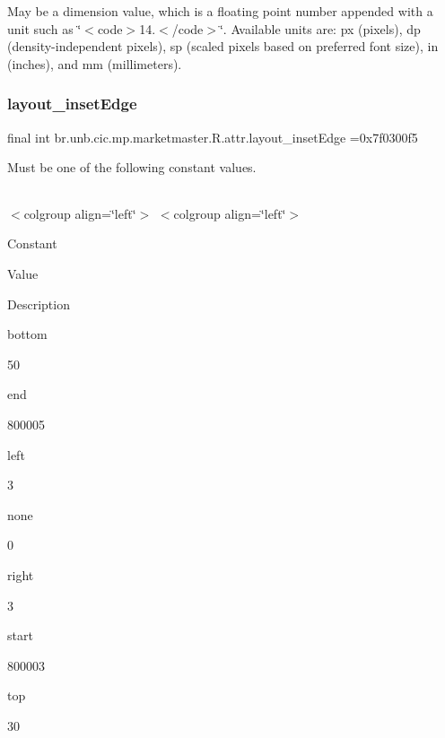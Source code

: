 May be a dimension value, which is a floating point number appended with a unit such as \char`\"{}$<$code$>$14.\+5sp$<$/code$>$\char`\"{}. Available units are\+: px (pixels), dp (density-\/independent pixels), sp (scaled pixels based on preferred font size), in (inches), and mm (millimeters). \mbox{\label{classbr_1_1unb_1_1cic_1_1mp_1_1marketmaster_1_1R_1_1attr_ab0227f12acd48c3f7bb1dbfd44242460}} 
\subsubsection{\texorpdfstring{layout\+\_\+inset\+Edge}{layout\_insetEdge}}
{\footnotesize\ttfamily final int br.\+unb.\+cic.\+mp.\+marketmaster.\+R.\+attr.\+layout\+\_\+inset\+Edge =0x7f0300f5\hspace{0.3cm}{\ttfamily [static]}}

Must be one of the following constant values.

\tabulinesep=1mm
\begin{longtabu} spread 0pt [c]{*{0}{|X[-1]}|}
\hline
\end{longtabu}
$<$colgroup align=\char`\"{}left\char`\"{}$>$ $<$colgroup align=\char`\"{}left\char`\"{}$>$ 

Constant

Value

Description 

bottom

50

end

800005

left

3

none

0

right

3

start

800003

top

30\mbox{\label{classbr_1_1unb_1_1cic_1_1mp_1_1marketmaster_1_1R_1_1attr_ab913f9922247da8a284c0bfcbb0a0d1e}} 
